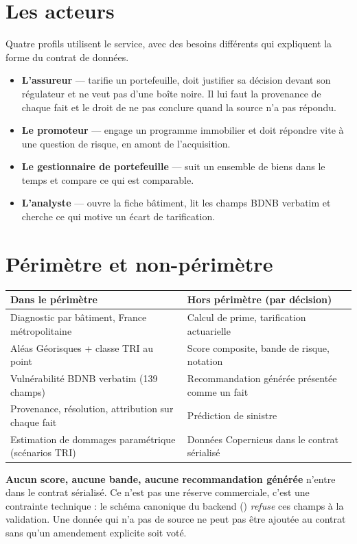 \section{Les acteurs}

Quatre profils utilisent le service, avec des besoins différents qui expliquent
la forme du contrat de données.

\begin{itemize}
  \item \textbf{L'assureur} — tarifie un portefeuille, doit justifier sa
    décision devant son régulateur et ne veut pas d'une boîte noire. Il lui faut
    la provenance de chaque fait et le droit de ne pas conclure quand la source
    n'a pas répondu.
  \item \textbf{Le promoteur} — engage un programme immobilier et doit répondre
    vite à une question de risque, en amont de l'acquisition.
  \item \textbf{Le gestionnaire de portefeuille} — suit un ensemble de biens
    dans le temps et compare ce qui est comparable.
  \item \textbf{L'analyste} — ouvre la fiche bâtiment, lit les champs BDNB
    verbatim et cherche ce qui motive un écart de tarification.
\end{itemize}

\section{Périmètre et non-périmètre}

\begin{tabularx}{\textwidth}{@{}lX@{}}
\toprule
\textbf{Dans le périmètre} & \textbf{Hors périmètre (par décision)} \\
\midrule
Diagnostic par bâtiment, France métropolitaine & Calcul de prime, tarification actuarielle \\
Aléas Géorisques + classe TRI au point & Score composite, bande de risque, notation \\
Vulnérabilité BDNB verbatim (139 champs) & Recommandation générée présentée comme un fait \\
Provenance, résolution, attribution sur chaque fait & Prédiction de sinistre \\
Estimation de dommages paramétrique (scénarios TRI) & Données Copernicus dans le contrat sérialisé \\
\bottomrule
\end{tabularx}

\begin{invariant}
\textbf{Aucun score, aucune bande, aucune recommandation générée} n'entre dans
le contrat sérialisé. Ce n'est pas une réserve commerciale, c'est une contrainte
technique : le schéma canonique du backend
() \emph{refuse} ces champs à la validation. Une
donnée qui n'a pas de source ne peut pas être ajoutée au contrat sans qu'un
amendement explicite soit voté.
\end{invariant}
